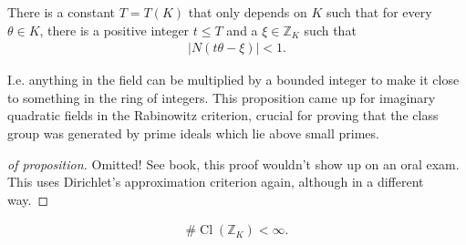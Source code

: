 \begin{proposition}

There is a constant \(T = T(K)\) that only depends on \(K\) such that
for every \(\theta\in K\), there is a positive integer \(t \leq T\) and
a \(\xi \in {\mathbb{Z}}_K\) such that
\begin{align*}
{\left\lvert {N(t \theta - \xi ) } \right\rvert} < 1
.\end{align*}

\end{proposition}

\begin{remark}

I.e. anything in the field can be multiplied by a bounded integer to
make it close to something in the ring of integers. This proposition
came up for imaginary quadratic fields in the Rabinowitz criterion,
crucial for proving that the class group was generated by prime ideals
which lie above small primes.

\end{remark}

\begin{proof}[of proposition]

Omitted! See book, this proof wouldn't show up on an oral exam. This
uses Dirichlet's approximation criterion again, although in a different
way.

\end{proof}

\begin{theorem}

\begin{align*}
\# { \operatorname{Cl}} ({\mathbb{Z}}_K) < \infty 
.\end{align*}

\end{theorem}

